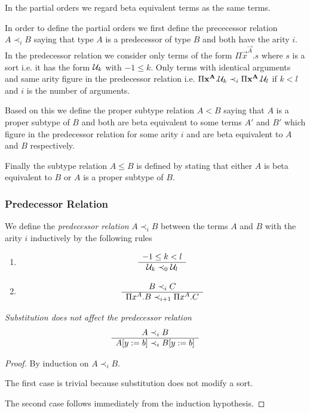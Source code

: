 In the partial orders we regard beta equivalent terms as the same terms.

In order to define the partial orders we first define the prececessor relation
$A \prec_i B$ saying that type $A$ is a predecessor of type $B$ and both have
the arity $i$. In the predecessor relation we consider only terms of the form
$\Pi \vec{x}^\vec{A}. s$ where $s$ is a sort i.e. it has the form ${\cal U}_k$ with
$-1 \le k$. Only terms with identical arguments and same arity figure in the
predecessor relation i.e. $\Pi {\mathbf x}^{\mathbf A}. {\cal U}_k \prec_i \Pi
{\mathbf x}^{\mathbf A}. {\cal U}_l$ if $k < l$ and $i$ is the number of arguments.

Based on this we define the proper subtype relation $A < B$ saying that $A$ is a
proper subtype of $B$ and both are beta equivalent to some terms $A'$ and $B'$
which figure in the predecessor relation for some arity $i$ and are beta
equivalent to $A$ and $B$ respectively.

Finally the subtype relation $A \le B$ is defined by stating that either $A$ is
beta equivalent to $B$ or $A$ is a proper subtype of $B$.



\subsubsection{Predecessor Relation}

\begin{definition}
    We define the
    \emph{predecessor relation}
    $A \prec_i B$ between the terms $A$
    and $B$ with the arity $i$ inductively by the following rules
    \begin{enumerate}
    \item
        $$
        \begin{array}{c} 
            -1 \le k < l
         \\ \hline 
            {\cal U}_k \prec_0 {\cal U}_l
        \end{array}
        $$

    \item
        $$
        \begin{array}{c} 
            B \prec_i C
         \\ \hline 
            \Pi x^A. B \prec_{i+1} \Pi x^A. C
        \end{array}
        $$
    \end{enumerate}
\end{definition}



\begin{lemma}
    \label{PrecedenceSubstitution}
    \emph{Substitution does not affect the predecessor relation}
    $$
    \begin{array}{c} A \prec_i B \\ \hline A[y:=b] \prec_i B[y:=b]\end{array}
    $$

    \begin{proof}
        By induction on $A \prec_i B$.

        The first case is trivial because substitution does not modify a sort.

        The second case follows immediately from the induction hypothesis.
    \end{proof}
\end{lemma}



